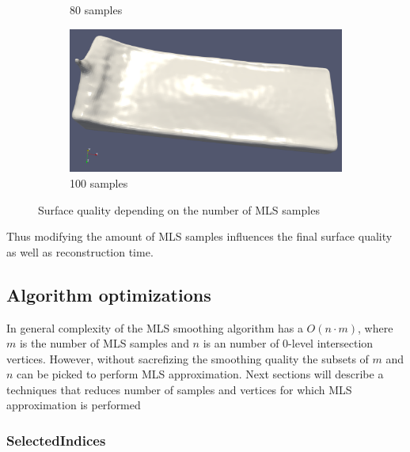 \begin{figure}[H]
\begin{center}
\begin{subfigure}[b]{0.4\textwidth}
			\caption{80 samples}
		\end{subfigure}
		\begin{subfigure}[b]{0.4\textwidth}
			\includegraphics[width=\textwidth]{figures/MlsSamples100.png}
			\caption{100 samples}
		\end{subfigure}
	\end{center}
	\caption{Surface quality depending on the number of MLS samples} \label{fig:mls_samples_example_surfaces}
\end{figure}
Thus modifying the amount of MLS samples influences the final surface quality as well as reconstruction time. 
\subsection{Algorithm optimizations}
In general complexity of the MLS smoothing algorithm has a $O(n \cdot m)$, where $m$ is the number of MLS samples and $n$ is an number of 0-level intersection vertices. However, without sacrefizing the smoothing quality the subsets of $m$ and $n$ can be picked to perform MLS approximation. Next sections will describe a techniques that reduces number of samples and vertices for which MLS approximation is performed 
\subsubsection{SelectedIndices}

